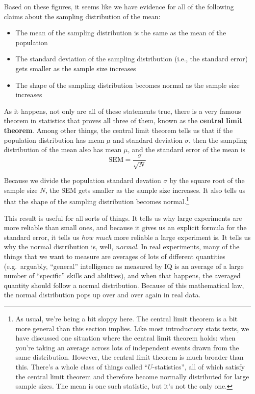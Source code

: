 \documentclass[
]{book}
\providecommand{\tightlist}{%
  \setlength{\itemsep}{0pt}\setlength{\parskip}{0pt}}
\theoremstyle{definition}
\theoremstyle{definition}
\theoremstyle{definition}
\theoremstyle{definition}
\theoremstyle{remark}
\begin{document}
Based on these figures, it seems like we have evidence for all of the following claims about the sampling distribution of the mean:

\begin{itemize}
\tightlist
\item
  The mean of the sampling distribution is the same as the mean of the population
\item
  The standard deviation of the sampling distribution (i.e., the standard error) gets smaller as the sample size increases
\item
  The shape of the sampling distribution becomes normal as the sample size increases
\end{itemize}

As it happens, not only are all of these statements true, there is a very famous theorem in statistics that proves all three of them, known as the \textbf{central limit theorem}. Among other things, the central limit theorem tells us that if the population distribution has mean \(\mu\) and standard deviation \(\sigma\), then the sampling distribution of the mean also has mean \(\mu\), and the standard error of the mean is
\[
\mbox{SEM} = \frac{\sigma}{ \sqrt{N} }
\]

Because we divide the population standard devation \(\sigma\) by the square root of the sample size \(N\), the SEM gets smaller as the sample size increases. It also tells us that the shape of the sampling distribution becomes normal.\footnote{As usual, we're being a bit sloppy here. The central limit theorem is a bit more general than this section implies. Like most introductory stats texts, we have discussed one situation where the central limit theorem holds: when you're taking an average across lots of independent events drawn from the same distribution. However, the central limit theorem is much broader than this. There's a whole class of things called ``\(U\)-statistics'', all of which satisfy the central limit theorem and therefore become normally distributed for large sample sizes. The mean is one such statistic, but it's not the only one.}

This result is useful for all sorts of things. It tells us why large experiments are more reliable than small ones, and because it gives us an explicit formula for the standard error, it tells us \emph{how much} more reliable a large experiment is. It tells us why the normal distribution is, well, \emph{normal}. In real experiments, many of the things that we want to measure are averages of lots of different quantities (e.g.~arguably, ``general'' intelligence as measured by IQ is an average of a large number of ``specific'' skills and abilities), and when that happens, the averaged quantity should follow a normal distribution. Because of this mathematical law, the normal distribution pops up over and over again in real data.
\end{document}
